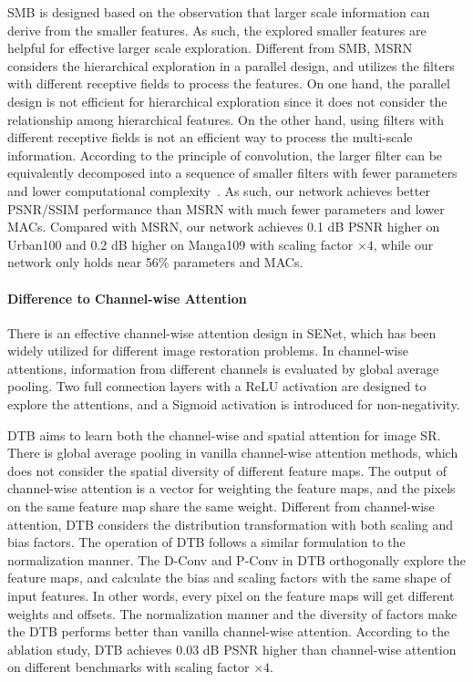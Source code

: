 \documentclass[manuscript,screen]{acmart}
\begin{document}
SMB is designed based on the observation that larger scale information can derive from the smaller features. As such, the explored smaller features are helpful for effective larger scale exploration. Different from SMB, MSRN considers the hierarchical exploration in a parallel design, and utilizes the filters with different receptive fields to process the features. On one hand, the parallel design is not efficient for hierarchical exploration since it does not consider the relationship among hierarchical features. On the other hand, using filters with different receptive fields is not an efficient way to process the multi-scale information. According to the principle of convolution, the larger filter can be equivalently decomposed into a sequence of smaller filters with fewer parameters and lower computational complexity~\cite{inception_cvpr2015}. As such, our network achieves better PSNR/SSIM performance than MSRN with much fewer parameters and lower MACs. Compared with MSRN, our network achieves 0.1 dB PSNR higher on Urban100 and 0.2 dB higher on Manga109 with scaling factor $\times4$, while our network only holds near 56\% parameters and MACs.


\paragraph{Difference to Channel-wise Attention~\cite{senet_pami2020}}
There is an effective channel-wise attention design in SENet, which has been widely utilized for different image restoration problems. In channel-wise attentions, information from different channels is evaluated by global average pooling. Two full connection layers with a ReLU activation are designed to explore the attentions, and a Sigmoid activation is introduced for non-negativity.


DTB aims to learn both the channel-wise and spatial attention for image SR. There is global average pooling in vanilla channel-wise attention methods, which does not consider the spatial diversity of different feature maps. The output of channel-wise attention is a vector for weighting the feature maps, and the pixels on the same feature map share the same weight. Different from channel-wise attention, DTB considers the distribution transformation with both scaling and bias factors. The operation of DTB follows a similar formulation to the normalization manner. The D-Conv and P-Conv in DTB orthogonally explore the feature maps, and calculate the bias and scaling factors with the same shape of input features. In other words, every pixel on the feature maps will get different weights and offsets. The normalization manner and the diversity of factors make the DTB performs better than vanilla channel-wise attention. According to the ablation study, DTB achieves 0.03 dB PSNR higher than channel-wise attention on different benchmarks with scaling factor $\times4$.
\end{document}
